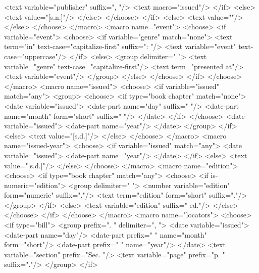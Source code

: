             <text variable="publisher" suffix=", "/>
            <text macro="issued"/>
          </if>
          <else>
            <text value="[s.n.]"/>
          </else>
        </choose>
      </if>
      <else>
        <text value=""/>
      </else>
    </choose>
  </macro>
  <macro name="event">
    <choose>
      <if variable="event">
        <choose>
          <if variable="genre" match="none">
            <text term="in" text-case="capitalize-first" suffix=": "/>
            <text variable="event" text-case="uppercase"/>
          </if>
          <else>
            <group delimiter=" ">
              <text variable="genre" text-case="capitalize-first"/>
              <text term="presented at"/>
              <text variable="event"/>
            </group>
          </else>
        </choose>
      </if>
    </choose>
  </macro>
  <macro name="issued">
    <choose>
      <if variable="issued" match="any">
        <group>
          <choose>
            <if type="book chapter" match="none">
              <date variable="issued">
                <date-part name="day" suffix=" "/>
                <date-part name="month" form="short" suffix=" "/>
              </date>
            </if>
          </choose>
          <date variable="issued">
            <date-part name="year"/>
          </date>
        </group>
      </if>
      <else>
        <text value="[s.d.]"/>
      </else>
    </choose>
  </macro>
  <macro name="issued-year">
    <choose>
      <if variable="issued" match="any">
        <date variable="issued">
          <date-part name="year"/>
        </date>
      </if>
      <else>
        <text value="[s.d.]"/>
      </else>
    </choose>
  </macro>
  <macro name="edition">
    <choose>
      <if type="book chapter" match="any">
        <choose>
          <if is-numeric="edition">
            <group delimiter=" ">
              <number variable="edition" form="numeric" suffix="."/>
              <text term="edition" form="short" suffix="."/>
            </group>
          </if>
          <else>
            <text variable="edition" suffix=" ed."/>
          </else>
        </choose>
      </if>
    </choose>
  </macro>
  <macro name="locators">
    <choose>
      <if type="bill">
        <group prefix=". " delimiter=", ">
          <date variable="issued">
            <date-part name="day"/>
            <date-part prefix=" " name="month" form="short"/>
            <date-part prefix=" " name="year"/>
          </date>
          <text variable="section" prefix="Sec. "/>
          <text variable="page" prefix="p. " suffix="."/>
        </group>
      </if>
